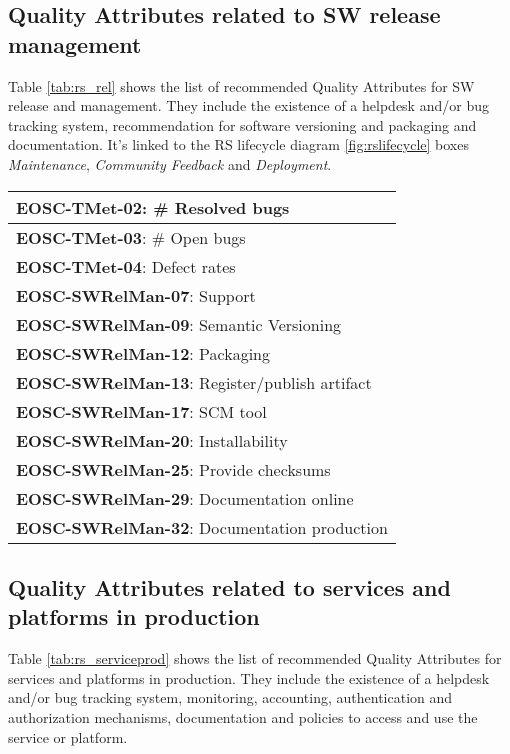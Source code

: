 \subsection{Quality Attributes related to SW release management}

Table \ref{tab:rs_rel} shows the list of recommended Quality Attributes for SW release and management. They include the existence of a helpdesk and/or bug tracking system, recommendation for software versioning and packaging and documentation. It's linked to the RS lifecycle diagram \ref{fig:rslifecycle} boxes \textit{Maintenance}, \textit{Community Feedback} and \textit{Deployment}.

\begin{center}
    \tablehead{\hline}
    \tabletail{\hline}
    \label{tab:rs_rel}
    \small
    \begin{supertabular}{|p{\linewidth}|}
    \textbf{EOSC-TMet-02}: \# Resolved bugs \\ \hline
    \textbf{EOSC-TMet-03}: \# Open bugs \\ \hline
    \textbf{EOSC-TMet-04}: Defect rates \\ \hline
    \textbf{EOSC-SWRelMan-07}: Support \\ \hline
    \textbf{EOSC-SWRelMan-09}: Semantic Versioning \\ \hline
    \textbf{EOSC-SWRelMan-12}: Packaging \\ \hline
    \textbf{EOSC-SWRelMan-13}: Register/publish artifact \\ \hline
    \textbf{EOSC-SWRelMan-17}: SCM tool \\ \hline
    \textbf{EOSC-SWRelMan-20}: Installability \\ \hline
    \textbf{EOSC-SWRelMan-25}: Provide checksums \\ \hline
    \textbf{EOSC-SWRelMan-29}: Documentation online \\ \hline
    \textbf{EOSC-SWRelMan-32}: Documentation production \\ \hline
    \end{supertabular}
\end{center}

\subsection{Quality Attributes related to services and platforms in production}

Table \ref{tab:rs_serviceprod} shows the list of recommended Quality Attributes for services and platforms in production. They include the existence of a helpdesk and/or bug tracking system, monitoring, accounting, authentication and authorization mechanisms, documentation and policies to access and use the service or platform.

